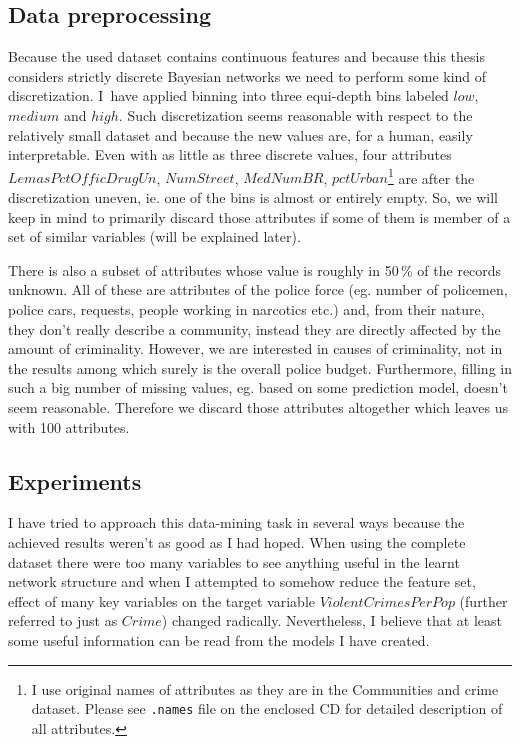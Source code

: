 \documentclass[english,cover]{fitthesis} %
\newcommand{\srccode}[1]{{\tt #1}}         %
\begin{document}
\subsection{Data preprocessing}
Because the used dataset contains continuous features and because this thesis considers strictly discrete Bayesian networks we need to perform some kind of discretization. I~have applied binning into three equi-depth bins labeled $low$, $medium$ and $high$. Such discretization seems reasonable with respect to the relatively small dataset and because the new values are, for a human, easily interpretable. Even with as little as three discrete values, four attributes $LemasPctOfficDrugUn$, $NumStreet$, $MedNumBR$, $pctUrban$\footnote{I use original names of attributes as they are in the Communities and crime dataset. Please see \srccode{.names} file on the enclosed CD for detailed description of all attributes.} are after the discretization uneven, ie. one of the bins is almost or entirely empty. So, we will keep in mind to primarily discard those attributes if some of them is member of a set of similar variables (will be explained later).

There is also a subset of attributes whose value is roughly in 50\,\% of the records unknown. All of these are attributes of the police force (eg. number of policemen, police cars, requests, people working in narcotics etc.) and, from their nature, they don't really describe a community, instead they are directly affected by the amount of criminality. However, we are interested in causes of criminality, not in the results among which surely is the overall police budget. Furthermore, filling in such a big number of missing values, eg. based on some prediction model, doesn't seem reasonable. Therefore we discard those attributes altogether which leaves us with 100 attributes.


\subsection{Experiments}
I have tried to approach this data-mining task in several ways because the achieved results weren't as good as I had hoped. When using the complete dataset there were too many variables to see anything useful in the learnt network structure and when I attempted to somehow reduce the feature set, effect of many key variables on the target variable $ViolentCrimesPerPop$ (further referred to just as $Crime$) changed radically. Nevertheless, I believe that at least some useful information can be read from the models I have created.
\end{document}
